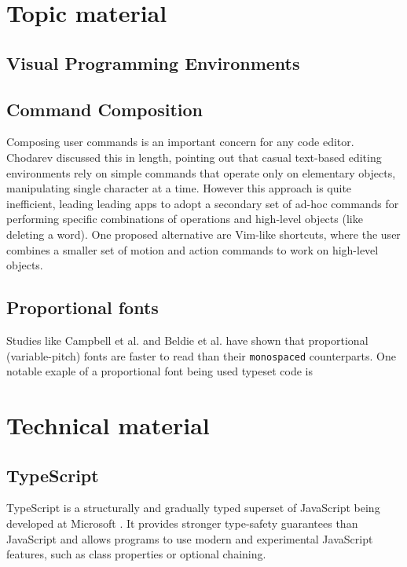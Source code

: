\documentclass[11pt]{report}
\begin{document}
\section{Topic material}

\subsection{Visual Programming Environments}


\subsection{Command Composition}
Composing user commands is an important concern for any code editor. Chodarev
\cite{Chodarev2016} discussed this in length, pointing out that casual
text-based editing environments rely on simple commands that operate only on
elementary objects, manipulating single character at a time. However this
approach is quite inefficient, leading leading apps to adopt a secondary set of
ad-hoc commands for performing specific combinations of operations and
high-level objects (like deleting a word). One proposed alternative are
Vim-like shortcuts, where the user combines a smaller set of motion and action
commands to work on high-level objects.

\subsection{Proportional fonts}
Studies like Campbell et al. \cite{Campbell1981} and Beldie et al.
\cite{Beldie1983} have shown that proportional (variable-pitch) fonts are
faster to read than their \texttt{monospaced} counterparts. One notable exaple
of a proportional font being used typeset code is 

\section{Technical material}

\subsection{TypeScript}
TypeScript is a structurally and gradually typed superset of JavaScript being
developed at Microsoft \cite{Typescript}. It provides stronger type-safety
guarantees than JavaScript and allows programs to use modern and experimental
JavaScript features, such as class properties or optional chaining. 
\end{document}
